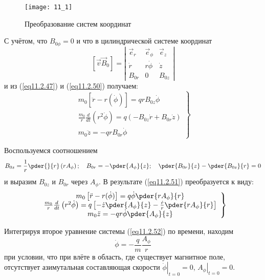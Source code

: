 \begin{figure}[h!]
	\center
	\texttt{[image: 11\_1]}
	\caption{Преобразование систем координат}
	\label{img11.1}
\end{figure}

С учётом, что \( B_{0\phi} = 0 \) и что в цилиндрической системе координат 
\[
	[\vec{v}\vec{B}_0] = \left|
	\begin{array}{ccc}
		\vec{e}_r & \vec{e}_\phi & \vec{e}_z \\
		\dot{r}   & r\dot{\phi}  & \dot{z}   \\
		B_{0r}    & 0            & B_{0z}
	\end{array} \right|
\]
и из (\ref{eq11.2.47}) и (\ref{eq11.2.50}) получаем:
\begin{equation}
	\left. \begin{array}{c}
		m_0 \left[ \ddot{r} - r(\dot{\phi}) \right] = qrB_{0z}\dot{\phi} \\
		\frac{m_0}{r}\frac{d}{dt}\left( r^2\dot{\phi} \right) = 
			q\left( -B_{0z}\dot{r} + B_{0r}\dot{z} \right) \\
		m_0 \ddot{z} = -qrB_{0r}\dot{\phi}
	\end{array} \right\}
	\label{eq11.2.51}
\end{equation}

Воспользуемся соотношением
\[
	B_{0z} = \frac{1}{r}\pder{}{r}\left( rA_\phi \right);\quad
	B_{0r} = -\pder{A_\phi}{z};\quad
	\pder{B_{0r}}{z} - \pder{B_{0z}}{r} = 0
\]
и выразим \( B_{0z} \) и \( B_{0r} \) через \( A_\phi \). В результате 
(\ref{eq11.2.51}) преобразуется к виду:
\begin{equation}
	\left. \begin{array}{c}
		m_0 \left[ \ddot{r} - r(\dot{\phi}) \right] = 
			q\dot{\phi}\pder{rA_\phi}{r} \\
		\frac{m_0}{r}\frac{d}{dt}\left( r^2\dot{\phi} \right) = 
			q\left[ -\dot{z}\pder{A_\phi}{z} - 
			\frac{\dot{r}}{r}\pder{rA_\phi}{r} \right] \\
		m_0 \ddot{z} = -qr\dot{\phi}\pder{A_\phi}{z}
	\end{array} \right\}
	\label{eq11.2.52}
\end{equation}

Интегрируя второе уравнение системы (\ref{eq11.2.52}) по времени, находим
\begin{equation}
	\dot{\phi} = -\frac{q}{m}\frac{A_\phi}{r}
	\label{eq11.2.53}
\end{equation}
при условии, что при влёте в область, где существует магнитное поле, 
отсутствует азимутальная составляющая скорости 
\( \left. \dot{\phi} \right|_{t=0} = 0 \), 
\( \left. A_\phi \right|_{t=0} = 0 \).

